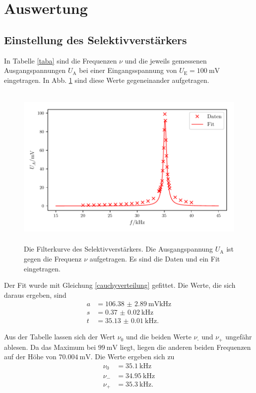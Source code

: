 \section{Auswertung}
\label{sec:Auswertung}

\subsection{Einstellung des Selektivverstärkers}
In Tabelle \ref{taba} sind die Frequenzen $\nu$ und die jeweils gemessenen Ausgangspannungen $U_\text{A}$ 
bei einer Eingangsspannung von $U_\text{E} = \SI{100}{\milli\volt}$ eingetragen. 
In Abb. \ref{plota} sind diese Werte gegeneinander aufgetragen.



\begin{figure}
    \centering
    \includegraphics[width=15cm, height=8cm]{build/plota2.pdf} %
    \caption{Die Filterkurve des Selektivverstärkers. Die Ausgangspannung $U_\text{A}$
    ist gegen die Frequenz $\nu$ aufgetragen. Es sind die Daten und ein Fit eingetragen.}
    \label{plota}
\end{figure}

\noindent Der Fit wurde mit Gleichung \eqref{cauchyverteilung} gefittet. Die Werte, die sich daraus ergeben, sind
\begin{align*} 
  a &= \SI{106.38(289)}{\milli\volt\kilo\hertz} \\
  s &= \SI{0.37(2)}{\kilo\hertz} \\
  t &= \SI{35.13(1)}{\kilo\hertz}. 
\end{align*}


\noindent Aus der Tabelle lassen sich der Wert $\nu_0$ und die beiden Werte $\nu_\text{-}$ und $\nu_\text{+}$ ungefähr ablesen.
Da das Maximum bei $\SI{99}{\milli\volt}$ liegt, liegen die anderen beiden Frequenzen auf der Höhe von $\SI{70.004}{\milli\volt}$.
Die Werte ergeben sich zu 
\begin{align*} 
 \nu_0 &= \SI{35.1}{\kilo\hertz} \\
 \nu_{-} &= \SI{34.95}{\kilo\hertz} \\
 \nu_{+} &= \SI{35.3}{\kilo\hertz}. 
\end{align*}

